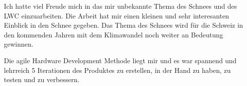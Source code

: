 Ich hatte viel Freude mich in das mir unbekannte Thema des Schnees und des LWC einzuarbeiten. Die Arbeit hat mir einen kleinen und sehr interesanten Einblick in den Schnee gegeben. Das Thema des Schnees wird für die Schweiz in den kommenden Jahren mit dem Klimawandel noch weiter an Bedeutung gewinnen.

Die agile Hardware Development Methode liegt mir und es war spannend und lehrreich 5 Iterationen des Produktes zu erstellen, in der Hand zu haben, zu testen und zu verbessern.
